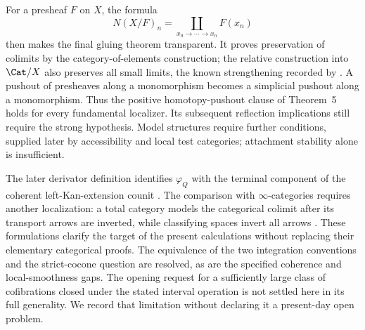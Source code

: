 For a presheaf $F$ on $X$, the formula
\[
 N(X/F)_n=\coprod_{x_0\to\cdots\to x_n}F(x_n)
\]
then makes the final gluing theorem transparent. It proves preservation of colimits by the category-of-elements construction; the relative construction into $\Cat/X$ also preserves all small limits, the known strengthening recorded by \citet[Proposition~3.2.12 and Corollary~3.2.13]{Cisinski2006}. A pushout of presheaves along a monomorphism becomes a simplicial pushout along a monomorphism. Thus the positive homotopy-pushout clause of Theorem~5 holds for every fundamental localizer. Its subsequent reflection implications still require the strong hypothesis. Model structures require further conditions, supplied later by accessibility and local test categories; attachment stability alone is insufficient.

The later derivator definition identifies $\varphi_Q$ with the terminal component of the coherent left-Kan-extension counit \citep[Definition~3.9]{Groth2013}. The comparison with $\infty$-categories requires another localization: a total category models the categorical colimit after its transport arrows are inverted, while classifying spaces invert all arrows \citep[Corollary~3.3.4.3]{Lurie2009HTT}. These formulations clarify the target of the present calculations without replacing their elementary categorical proofs. The equivalence of the two integration conventions and the strict-cocone question are resolved, as are the specified coherence and local-smoothness gaps. The opening request for a sufficiently large class of cofibrations closed under the stated interval operation is not settled here in its full generality. We record that limitation without declaring it a present-day open problem.
